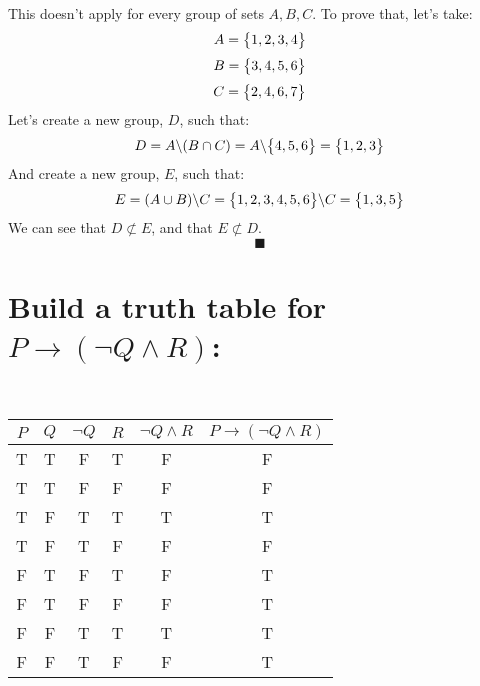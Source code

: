 \documentclass[a4paper, 12pt]{article}
\newcommand{\?}{\stackrel{?}{=}}
\renewcommand{\qed}{$$\blacksquare$$}
\begin{document}
\begin{titlepage}
    
\end{titlepage}



\setcounter{section}{1}
\section{}
This doesn't apply for every group of sets $A,B,C$.
To prove that, let's take:
$$ A = \big{\{}1,2,3,4 \big{\}} $$
$$ B = \big{\{}3,4,5,6 \big{\}} $$
$$ C = \big{\{}2,4,6,7 \big{\}} $$
Let's create a new group, $D$, such that:
$$ D = A  \backslash (B\cap{C}) =  A  \backslash \big{\{}4,5,6 \big{\}} = \big{\{}1,2,3 \big{\}}$$
And create a new group, $E$, such that:
$$ E = (A\cup{B}) \backslash{C} =  \big{\{}1,2,3,4,5,6 \big{\}} \backslash{C} = \big{\{}1,3,5 \big{\}}$$
We can see that $ D \not\subset E $, and that $ E \not\subset D $.
\qed

\section{Build a truth table for $P\rightarrow(\neg{Q}\land{R})$:}
\begin{center}
    ~\\
    \begin{tabular}{|c|c|c|c|c|c|} 
    \hline
    $P$ & $Q$ & $\neg{Q}$ & $R$ & $\neg{Q}\land{R}$ & $ P\rightarrow(\neg{Q}\land{R})$ \\ [0.5ex] 
    \hline
    T & T & F & T & F & F \\
    \hline
    T & T & F & F & F & F \\
    \hline
    T & F & T & T & T & T \\
    \hline
    T & F & T & F & F & F \\
    \hline
    F & T & F & T & F & T \\
    \hline
    F & T & F & F & F & T \\
    \hline
    F & F & T & T & T & T \\
    \hline
    F & F & T & F & F & T \\
    \hline
   \end{tabular}
\end{center}
\pagebreak

\end{document}
